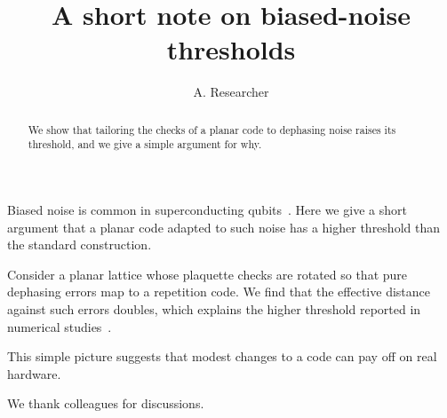 \documentclass[aps,prl,twocolumn]{revtex4-2}
\begin{document}
\title{A short note on biased-noise thresholds}
\author{A. Researcher}

\begin{abstract}
We show that tailoring the checks of a planar code to dephasing noise raises its threshold, and we give a simple argument for why.
\end{abstract}

\maketitle

Biased noise is common in superconducting qubits~\cite{tuckett2018}. Here we give a short argument that a planar code adapted to such noise has a higher threshold than the standard construction.

Consider a planar lattice whose plaquette checks are rotated so that pure dephasing errors map to a repetition code. We find that the effective distance against such errors doubles, which explains the higher threshold reported in numerical studies~\cite{tuckett2018}.

This simple picture suggests that modest changes to a code can pay off on real hardware.

\begin{acknowledgments}
We thank colleagues for discussions.
\end{acknowledgments}


\end{document}
